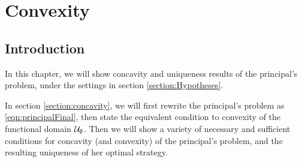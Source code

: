 \chapter{Convexity}\label{chapter:convexity}





\section{Introduction}\label{secttion:intro}

In this chapter, we will show concavity and uniqueness results of the principal's problem, under the settings in section \ref{section:Hypotheses}.
\medskip

In section \ref{section:concavity}, we will first rewrite the principal's problem as \eqref{eqn:principalFinal}, then state the equivalent condition to convexity of the functional domain $\mathcal{U}_{\emptyset}$. Then we will show a variety of necessary and sufficient conditions for concavity (and convexity) of the principal's problem, and the resulting uniqueness of her optimal strategy.  


